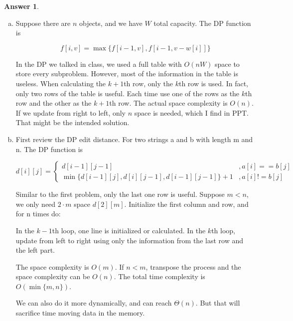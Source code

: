 \documentclass{article}
\theoremstyle{definition}
\newtheorem{ans}{Answer}
\begin{document}
	\begin{ans}
		~
		
		\begin{enumerate}[(a)]
			\item Suppose there are $n$ objects, and we have $W$ total capacity. The DP function is 
		
			$$
			f[i, v]=\max \{f[i-1, v], f[i-1, v-w[i]]\}
			$$
			
			In the DP we talked in class, we used a full table with $O(nW)$ space to store every subproblem. However, most of the information in the table is useless. When calculating the $k+1$th row, only the $k$th row is used. In fact, only two rows of the table is useful. Each time use one of the rows as the $k$th row and the other as the $k+1$th row. The actual space complexity is $O(n)$. If we update from right to left, only $n$ space is needed, which I find in PPT. That might be the intended solution.
			\item First review the DP edit distance. For two strings a and b with length m and n. The DP function is 
			
			$$
			d[i][j]=
			\begin{cases}
				d[i-1][j-1] & ,a[i]==b[j]\\
				\min\{d[i-1][j], d[i][j-1], d[i-1][j-1]\}+1 & ,a[i]!=b[j]
			\end{cases}
			$$
			
			Similar to the first problem, only the last one row is useful. Suppose $m<n$, we only need $2\cdot m$ space $d[2][m]$. Initialize the first column and row, and for n times do:
			
			In the $k-1$th loop, one line is initialized or calculated. In the $k$th loop, update from left to right using only the information from the last row and the left part. 
			
			The space complexity is $O(m)$. If $n<m$, transpose the process and the space complexity can be $O(n)$. The total time complexity is $O(\min\{m, n\})$.
			
			We can also do it more dynamically, and can reach $\Theta(n)$. But that will sacrifice time moving data in the memory.
		\end{enumerate}
	\end{ans}
	
\end{document}
